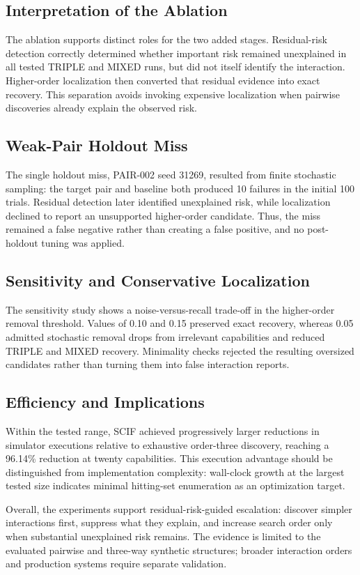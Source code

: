 \subsection{Interpretation of the Ablation}

The ablation supports distinct roles for the two added stages. Residual-risk detection correctly determined whether important risk remained unexplained in all tested TRIPLE and MIXED runs, but did not itself identify the interaction. Higher-order localization then converted that residual evidence into exact recovery. This separation avoids invoking expensive localization when pairwise discoveries already explain the observed risk.

\subsection{Weak-Pair Holdout Miss}

The single holdout miss, PAIR-002 seed 31269, resulted from finite stochastic sampling: the target pair and baseline both produced 10 failures in the initial 100 trials. Residual detection later identified unexplained risk, while localization declined to report an unsupported higher-order candidate. Thus, the miss remained a false negative rather than creating a false positive, and no post-holdout tuning was applied.

\subsection{Sensitivity and Conservative Localization}

The sensitivity study shows a noise-versus-recall trade-off in the higher-order removal threshold. Values of 0.10 and 0.15 preserved exact recovery, whereas 0.05 admitted stochastic removal drops from irrelevant capabilities and reduced TRIPLE and MIXED recovery. Minimality checks rejected the resulting oversized candidates rather than turning them into false interaction reports.

\subsection{Efficiency and Implications}

Within the tested range, SCIF achieved progressively larger reductions in simulator executions relative to exhaustive order-three discovery, reaching a 96.14\% reduction at twenty capabilities. This execution advantage should be distinguished from implementation complexity: wall-clock growth at the largest tested size indicates minimal hitting-set enumeration as an optimization target.

Overall, the experiments support residual-risk-guided escalation: discover simpler interactions first, suppress what they explain, and increase search order only when substantial unexplained risk remains. The evidence is limited to the evaluated pairwise and three-way synthetic structures; broader interaction orders and production systems require separate validation.
